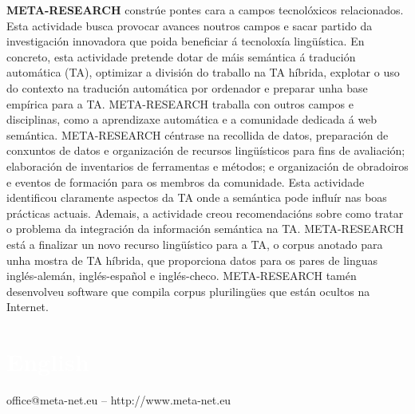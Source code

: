 \begin{multicols}{2}
 \textbf{META-RESEARCH} constrúe pontes cara a campos tecnolóxicos relacionados. Esta actividade busca provocar avances noutros campos e sacar partido da investigación innovadora que poida beneficiar á tecnoloxía lingüística. En concreto, esta actividade pretende dotar de máis semántica á tradución automática (TA), optimizar a división do traballo na TA híbrida, explotar o uso do contexto na tradución automática por ordenador e preparar unha base empírica para a TA. META-RESEARCH traballa con outros campos e disciplinas, como a aprendizaxe automática e a comunidade dedicada á web semántica. META-RESEARCH céntrase na recollida de datos, preparación de conxuntos de datos e organización de recursos lingüísticos para fins de avaliación; elaboración de inventarios de ferramentas e métodos; e organización de obradoiros e eventos de formación para os membros da comunidade. Esta actividade identificou claramente aspectos da TA onde a semántica pode influír nas boas prácticas actuais. Ademais, a actividade creou recomendacións sobre como tratar o problema da integración da información semántica na TA. META-RESEARCH está a finalizar un novo recurso lingüístico para a TA, o corpus anotado para unha mostra de TA híbrida, que proporciona datos para os pares de linguas inglés-alemán, inglés-español e inglés-checo. META-RESEARCH tamén desenvolveu software que compila corpus plurilingües que están ocultos na Internet.
 

\end{multicols}
\cleardoublepage

\vfill

\makeatletter
{}
{
  \renewcommand*{\theHsection}{\thepart.\thesection}
}
\makeatother
\part*{\textcolor{white}{English}}
\setcounter{section}{0}
\setcounter{figure}{0}

\centerline{office@meta-net.eu -- http://www.meta-net.eu}


\cleardoublepage



